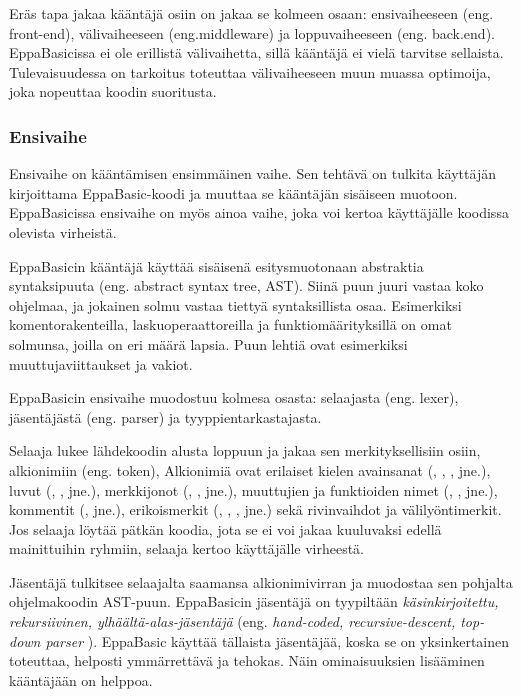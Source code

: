 Eräs tapa jakaa kääntäjä osiin on jakaa
se kolmeen osaan:
ensivaiheeseen (eng. front-end),
välivaiheeseen (eng.middleware) ja
loppuvaiheeseen (eng. back.end).
EppaBasicissa ei ole erillistä välivaihetta,
sillä kääntäjä ei vielä tarvitse sellaista.
Tulevaisuudessa on tarkoitus toteuttaa
välivaiheeseen muun muassa optimoija,
joka nopeuttaa koodin suoritusta.

\subsubsection{Ensivaihe}
Ensivaihe on kääntämisen ensimmäinen vaihe.
Sen tehtävä on tulkita käyttäjän kirjoittama
EppaBasic-koodi ja muuttaa se kääntäjän
sisäiseen muotoon.
EppaBasicissa ensivaihe on myös ainoa
vaihe, joka voi kertoa käyttäjälle
koodissa olevista virheistä.

EppaBasicin kääntäjä käyttää sisäisenä
esitysmuotonaan abstraktia syntaksipuuta
(eng. abstract syntax tree, AST).
Siinä puun juuri vastaa koko ohjelmaa,
ja jokainen solmu vastaa tiettyä
syntaksillista osaa.
Esimerkiksi komentorakenteilla,
laskuoperaattoreilla ja
funktiomäärityksillä
on omat solmunsa, joilla on eri määrä lapsia.
Puun lehtiä ovat esimerkiksi
muuttujaviittaukset ja vakiot.

EppaBasicin ensivaihe muodostuu
kolmesa osasta:
selaajasta (eng. lexer),
jäsentäjästä (eng. parser) ja
tyyppientarkastajasta.

Selaaja lukee lähdekoodin alusta loppuun
ja jakaa sen merkityksellisiin osiin,
alkionimiin (eng. token),
Alkionimiä ovat erilaiset kielen
avainsanat (, , , jne.),
luvut (, , jne.),
merkkijonot (, , jne.),
muuttujien ja funktioiden nimet (, , jne.),
kommentit (, jne.),
erikoismerkit (\eb{+}, \eb{-}, \eb{^}, jne.) sekä
rivinvaihdot ja välilyöntimerkit.
Jos selaaja löytää pätkän koodia,
jota se ei voi jakaa kuuluvaksi
edellä mainittuihin ryhmiin,
selaaja kertoo käyttäjälle virheestä.

Jäsentäjä tulkitsee selaajalta saamansa
alkionimivirran ja muodostaa sen pohjalta
ohjelmakoodin AST-puun.
EppaBasicin jäsentäjä on tyypiltään
\emph{käsinkirjoitettu, rekursiivinen,
ylhäältä-alas-jäsentäjä}
(eng. \emph{hand-coded, recursive-descent,
top-down parser} \cite[luku 3.3.2]{eac2e}).
EppaBasic käyttää tällaista jäsentäjää,
koska se on yksinkertainen toteuttaa,
helposti ymmärrettävä ja tehokas.
Näin ominaisuuksien lisääminen
kääntäjään on helppoa.

